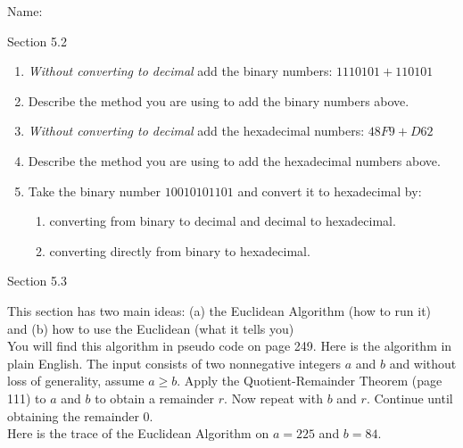 \documentclass[12pt]{article}
\def\bc{\begin{center}}
\def\ec{\end{center}}
\newcommand{\be}{\begin{enumerate}}
\newcommand{\ee}{\end{enumerate}}
\begin{document}
\thispagestyle{fancy}

\quad
Name: \\

\quad
\bc Section 5.2 \ec
\be
\item \emph{Without converting to decimal} add the binary numbers: $1110101+110101$
\vfill
\item Describe the method you are using to add the binary numbers above.
\vfill
\item \emph{Without converting to decimal} add the hexadecimal numbers: $48F9+D62$
\vfill
\item Describe the method you are using to add the hexadecimal numbers above.
\vfill
\item Take the binary number $10010101101$ and convert it to hexadecimal by:
\be
\item converting from binary to decimal and decimal to hexadecimal.
\vfill
\item converting directly from binary to hexadecimal.
\vfill
\ee
\ee
\newpage
\bc Section 5.3 \ec

This section has two main ideas: (a) the Euclidean Algorithm (how to run it)\\
\indent and \hspace{2.02in} (b) how to use the Euclidean (what it tells you)\\

You will find this algorithm in pseudo code on page 249. Here is the algorithm in plain English. The input consists of two nonnegative integers $a$ and $b$ and without loss of generality, assume $a \geq b$. Apply the Quotient-Remainder Theorem (page 111) to $a$ and $b$ to obtain a remainder $r.$ Now repeat with $b$ and $r.$ Continue until obtaining the remainder $0.$\\

Here is the trace of the Euclidean Algorithm on $a=225$ and $b=84.$\\
\end{document}
